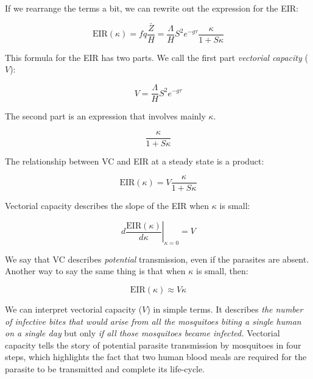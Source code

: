 \documentclass[
]{book}
\begin{document}
If we rearrange the terms a bit, we can rewrite out the expression for the EIR:

\begin{equation}
\mbox{EIR}(\kappa) = fq \frac{\bar Z}{H} = \frac{\Lambda}{H} S^2  e^{-g\tau} \frac{\kappa}{1 + S \kappa} 
\end{equation}

This formula for the EIR has two parts. We call the first part \emph{vectorial capacity} (\(V\)):

\begin{equation}
V = \frac{\Lambda}{H} S^2  e^{-g\tau} 
\label{eq:VCdefined}
\end{equation}

The second part is an expression that involves mainly \(\kappa\).

\begin{equation}
\frac{\kappa}{1 + S \kappa} 
\label{eq:EIR2ndpart}
\end{equation}

The relationship between VC and EIR at a steady state is a product:

\begin{equation}
\mbox{EIR}(\kappa) = V \frac{\kappa}{1 + S \kappa} 
\label{eq:EIR2VC}
\end{equation}

Vectorial capacity describes the slope of the EIR when \(\kappa\) is small:

\begin{equation}
\left. d\frac{\mbox{EIR}(\kappa)}{d\kappa}\right|_{\kappa = 0} = V
\label{eq:VCisdEIR}
\end{equation}

We say that VC describes \emph{potential} transmission, even if the parasites are absent. Another way to say the same thing is that when \(\kappa\) is small, then:

\begin{equation}
\mbox{EIR}(\kappa) \approx V \kappa
\end{equation}

We can interpret vectorial capacity (\(V\)) in simple terms. It describes \emph{the number of infective bites that would arise from all the mosquitoes biting a single human on a single day} but only \emph{if all those mosquitoes became infected.} Vectorial capacity tells the story of potential parasite transmission by mosquitoes in four steps, which highlights the fact that two human blood meals are required for the parasite to be transmitted and complete its life-cycle.
\end{document}
